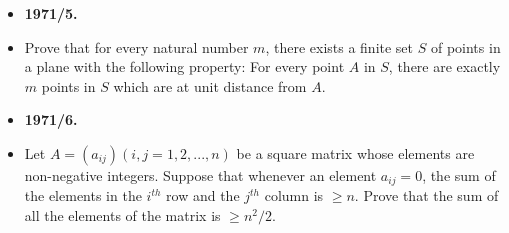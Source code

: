 \documentclass[a4paper,12pt]{article}
\begin{document}
\begin{itemize}[label={},leftmargin=0pt]
\begin{enumerate}[label=(\alph*)]
	\item If $\angle DAB + \angle BCD = \angle CDA + \angle ABC$, then there are infinitely manyshortest polygonal paths, their common length being $2AC \sin (\alpha /2)$, where $ \alpha = \angle BAC + \angle CAD +  \angle DAB$.
\end{enumerate}
\item \textbf{\large 1971/5.}
\item Prove that for every natural number $m$, there exists a finite set $S$ of points in a plane with the following property: For every point $A$ in $S$, there are exactly $m$ points in $S$ which are at unit distance from $A$.
\item \textbf{\large 1971/6.}
\item Let $A = (a_{ij} )(i, j = 1, 2, ..., n)$ be a square matrix whose elements are non-negative integers. Suppose that whenever an element $a_{ij} = 0$, the sum of the elements in the $i^{th}$ row and the $j^{th}$ column is $\geq n$. Prove that the sum of all the elements of the matrix is $\geq n^2/2$.
\end{itemize}
\end{document}
